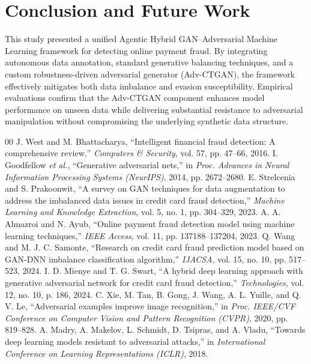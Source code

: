 \documentclass[conference]{IEEEtran}
\begin{document}
\section{Conclusion and Future Work}
This study presented a unified Agentic Hybrid GAN--Adversarial Machine Learning framework for detecting online payment fraud. By integrating autonomous data annotation, standard generative balancing techniques, and a custom robustness-driven adversarial generator (Adv-CTGAN), the framework effectively mitigates both data imbalance and evasion susceptibility. Empirical evaluations confirm that the Adv-CTGAN component enhances model performance on unseen data while delivering substantial resistance to adversarial manipulation without compromising the underlying synthetic data structure.

\begin{thebibliography}{00}
 J. West and M. Bhattacharya, ``Intelligent financial fraud detection: A comprehensive review,'' \emph{Computers \& Security}, vol. 57, pp. 47--66, 2016.
 I. Goodfellow \emph{et al.}, ``Generative adversarial nets,'' in \emph{Proc. Advances in Neural Information Processing Systems (NeurIPS)}, 2014, pp. 2672--2680.
 E. Strelcenia and S. Prakoonwit, ``A survey on GAN techniques for data augmentation to address the imbalanced data issues in credit card fraud detection,'' \emph{Machine Learning and Knowledge Extraction}, vol. 5, no. 1, pp. 304--329, 2023.
 A. A. Almazroi and N. Ayub, ``Online payment fraud detection model using machine learning techniques,'' \emph{IEEE Access}, vol. 11, pp. 137188--137204, 2023.
 Q. Wang and M. J. C. Samonte, ``Research on credit card fraud prediction model based on GAN-DNN imbalance classification algorithm,'' \emph{IJACSA}, vol. 15, no. 10, pp. 517--523, 2024.
 I. D. Mienye and T. G. Swart, ``A hybrid deep learning approach with generative adversarial network for credit card fraud detection,'' \emph{Technologies}, vol. 12, no. 10, p. 186, 2024.
 C. Xie, M. Tan, B. Gong, J. Wang, A. L. Yuille, and Q. V. Le, ``Adversarial examples improve image recognition,'' in \emph{Proc. IEEE/CVF Conference on Computer Vision and Pattern Recognition (CVPR)}, 2020, pp. 819--828.
 A. Madry, A. Makelov, L. Schmidt, D. Tsipras, and A. Vladu, ``Towards deep learning models resistant to adversarial attacks,'' in \emph{International Conference on Learning Representations (ICLR)}, 2018.

\end{thebibliography}
\end{document}
